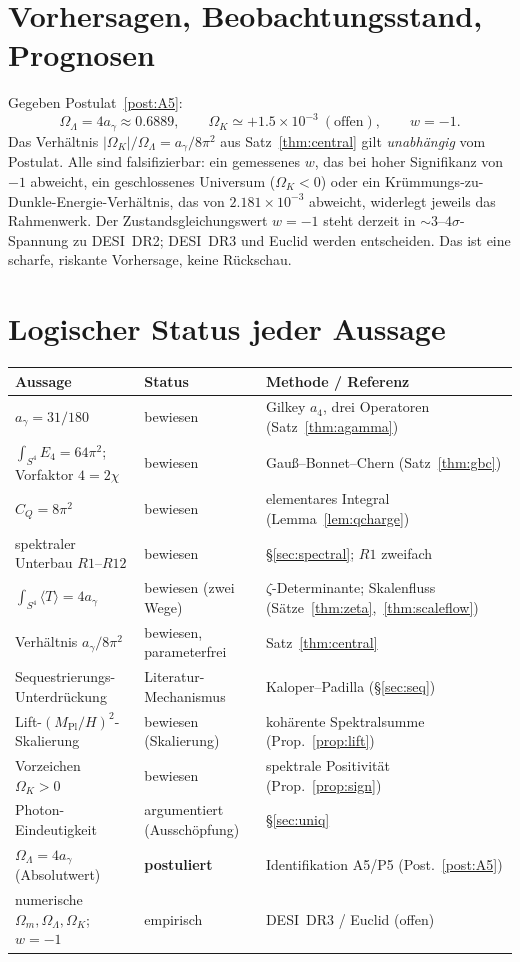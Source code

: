 \documentclass[11pt,a4paper]{article}
\theoremstyle{definition}
\theoremstyle{remark}
\newcommand{\ag}{a_\gamma}
\newcommand{\CQ}{C_Q}
\newcommand{\Ok}{\Omega_K}
\newcommand{\OL}{\Omega_\Lambda}
\newcommand{\Om}{\Omega_m}
\newcommand{\Mpl}{M_{\mathrm{Pl}}}
\newcommand{\avg}[1]{\langle #1\rangle}
\begin{document}
\section{Vorhersagen, Beobachtungsstand, Prognosen}\label{sec:obs}
Gegeben Postulat~\ref{post:A5}:
\[
\OL=4\ag\approx0.6889,\qquad \Ok\simeq+1.5\times10^{-3}\ (\text{offen}),\qquad w=-1 .
\]
Das Verhältnis $\lvert\Ok\rvert/\OL=\ag/8\pi^2$ aus Satz~\ref{thm:central} gilt \emph{unabhängig}
vom Postulat. Alle sind falsifizierbar: ein gemessenes $w$, das bei hoher Signifikanz von $-1$
abweicht, ein geschlossenes Universum ($\Ok<0$) oder ein Krümmungs-zu-Dunkle-Energie-Verhältnis, das
von $2.181\times10^{-3}$ abweicht, widerlegt jeweils das Rahmenwerk. Der
Zustandsgleichungswert $w=-1$ steht derzeit in $\sim3$--$4\sigma$-Spannung zu DESI~DR2; DESI~DR3 und
Euclid werden entscheiden. Das ist eine scharfe, riskante Vorhersage, keine Rückschau.

\section{Logischer Status jeder Aussage}\label{sec:ledger}
\begin{center}
\begin{tabular}{lll}
\toprule
Aussage & Status & Methode / Referenz \\
\midrule
$\ag=31/180$ & bewiesen & Gilkey $a_4$, drei Operatoren (Satz~\ref{thm:agamma}) \\
$\int_{S^4}E_4=64\pi^2$; Vorfaktor $4=2\chi$ & bewiesen & Gauß--Bonnet--Chern (Satz~\ref{thm:gbc}) \\
$\CQ=8\pi^2$ & bewiesen & elementares Integral (Lemma~\ref{lem:qcharge}) \\
spektraler Unterbau $R1$--$R12$ & bewiesen & \S\ref{sec:spectral}; $R1$ zweifach \\
$\int_{S^4}\avg T=4\ag$ & bewiesen (zwei Wege) & $\zeta$-Determinante; Skalenfluss (Sätze~\ref{thm:zeta},~\ref{thm:scaleflow}) \\
Verhältnis $\ag/8\pi^2$ & bewiesen, parameterfrei & Satz~\ref{thm:central} \\
Sequestrierungs-Unterdrückung & Literatur-Mechanismus & Kaloper--Padilla (\S\ref{sec:seq}) \\
Lift-$(\Mpl/H)^2$-Skalierung & bewiesen (Skalierung) & kohärente Spektralsumme (Prop.~\ref{prop:lift}) \\
Vorzeichen $\Ok>0$ & bewiesen & spektrale Positivität (Prop.~\ref{prop:sign}) \\
Photon-Eindeutigkeit & argumentiert (Ausschöpfung) & \S\ref{sec:uniq} \\
$\OL=4\ag$ (Absolutwert) & \textbf{postuliert} & Identifikation A5/P5 (Post.~\ref{post:A5}) \\
numerische $\Om,\OL,\Ok$; $w=-1$ & empirisch & DESI~DR3 / Euclid (offen) \\
\bottomrule
\end{tabular}
\end{center}
\end{document}
